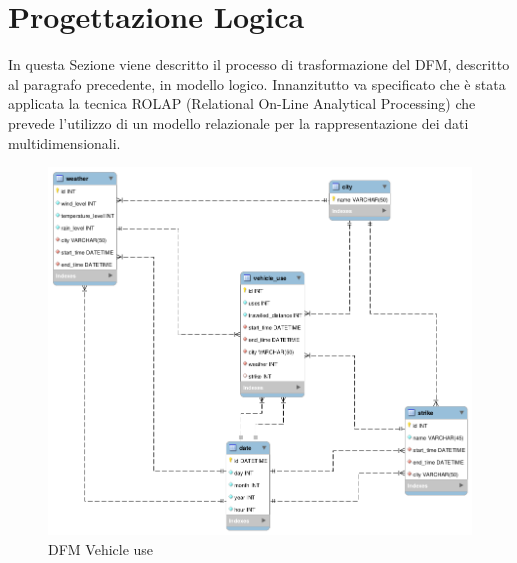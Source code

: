\section{Progettazione Logica}
In questa Sezione viene descritto il processo di trasformazione del DFM, descritto al paragrafo precedente, in modello logico. 
Innanzitutto va specificato che è stata applicata la tecnica ROLAP (Relational On-Line Analytical Processing) che prevede l’utilizzo di un
modello relazionale per la rappresentazione dei dati multidimensionali.

\begin{figure}[H]                                                                                                                                                            
\centering                                                                                                                                                                   
\includegraphics[width=\textwidth]{diagrams/logic}                                                                                                                                   
\caption{DFM Vehicle use}                                                                                                                                            
\label{fig:logic}                                                                                                                                                           
\end{figure}
